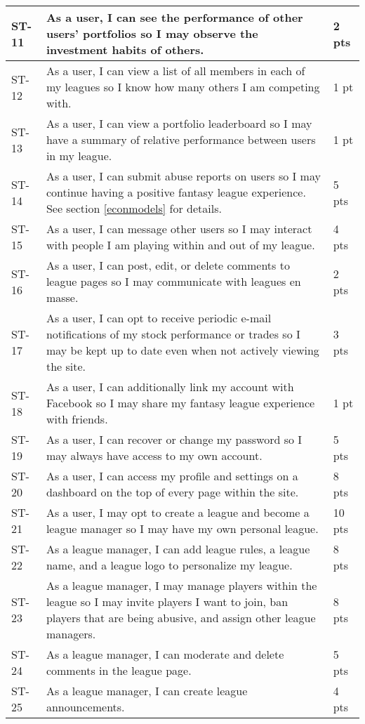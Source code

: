 \begin{longtable}{|p{0.6in}|p{4.6in}|p{0.5in}|}
ST-11&As a user, I can see the performance of other users' portfolios so I may observe the investment habits of others.&2 pts  \\ \hline 
ST-12&As a user, I can view a list of all members in each of my leagues so I know how many others I am competing with.&1 pt   \\ \hline 
ST-13&As a user, I can view a portfolio leaderboard so I may have a summary of relative performance between users in my league.&1 pt   \\ \hline 
ST-14&As a user, I can submit abuse reports on users so I may continue having a positive fantasy league experience. See section \ref{econmodels} for details.&5 pts  \\ \hline 
ST-15&As a user, I can message other users so I may interact with people I am playing within and out of my league.&4 pts  \\ \hline 
ST-16&As a user, I can post, edit, or delete comments to league pages so I may communicate with leagues en masse.&2 pts  \\ \hline 
ST-17&As a user, I can opt to receive periodic e-mail notifications of my stock performance or trades so I may be kept up to date even when not actively viewing the site.&3 pts  \\ \hline 
ST-18&As a user, I can additionally link my account with Facebook so I may share my fantasy league experience with friends.&1 pt   \\ \hline 
ST-19&As a user, I can recover or change my password so I may always have access to my own account.&5 pts  \\ \hline 
ST-20&As a user, I can access my profile and settings on a dashboard on the top of every page within the site.&8 pts  \\ \hline 
ST-21&As a user, I may opt to create a league and become a league manager so I may have my own personal league.&10 pts \\ \hline 
ST-22&As a league manager, I can add league rules, a league name, and a league logo to personalize my league.&8 pts  \\ \hline 
ST-23&As a league manager, I may manage players within the league so I may invite players I want to join, ban players that are being abusive, and assign other league managers.&8 pts  \\ \hline 
ST-24&As a league manager, I can moderate and delete comments in the league page.&5 pts  \\ \hline 
ST-25&As a league manager, I can create league announcements.&4 pts  \\ \hline 

\end{longtable}
